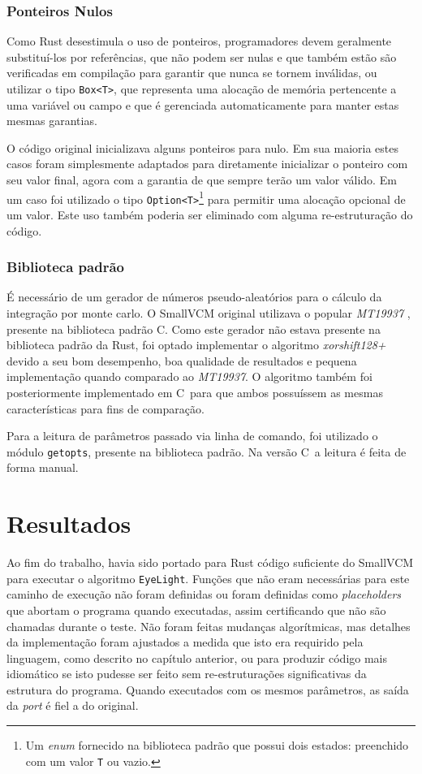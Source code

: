 \documentclass[tg]{mdtufsm}
\def\Cpp{{C\nolinebreak[4]\raisebox{.20ex}{\small\bf++}}}
\begin{document}
\subsection{Ponteiros Nulos}

Como Rust desestimula o uso de ponteiros, programadores devem geralmente substituí-los por referências, que não podem ser nulas e que também estão são verificadas em compilação para garantir que nunca se tornem inválidas, ou utilizar o tipo \texttt{Box<T>}, que representa uma alocação de memória pertencente a uma variável ou campo e que é gerenciada automaticamente para manter estas mesmas garantias.

O código original inicializava alguns ponteiros para nulo. Em sua maioria estes casos foram simplesmente adaptados para diretamente inicializar o ponteiro com seu valor final, agora com a garantia de que sempre terão um valor válido. Em um caso foi utilizado o tipo \texttt{Option<T>}\footnote{Um \emph{enum} fornecido na biblioteca padrão que possui dois estados: preenchido com um valor \texttt{T} ou vazio.} para permitir uma alocação opcional de um valor. Este uso também poderia ser eliminado com alguma re-estruturação do código.

\subsection{Biblioteca padrão}

É necessário de um gerador de números pseudo-aleatórios para o cálculo da integração por monte carlo. O SmallVCM original utilizava o popular \emph{MT19937}  \citep{matsumoto1998}, presente na biblioteca padrão \Cpp. Como este gerador não estava presente na biblioteca padrão da Rust, foi optado implementar o algoritmo \emph{xorshift128+} \citep{vigna2014} devido a seu bom desempenho, boa qualidade de resultados e pequena implementação quando comparado ao \emph{MT19937}. O algoritmo também foi posteriormente implementado em \Cpp\ para que ambos possuíssem as mesmas características para fins de comparação.

Para a leitura de parâmetros passado via linha de comando, foi utilizado o módulo \texttt{getopts}, presente na biblioteca padrão. Na versão \Cpp\ a leitura é feita de forma manual.

\chapter{Resultados}

Ao fim do trabalho, havia sido portado para Rust código suficiente do SmallVCM para executar o algoritmo \texttt{EyeLight}. Funções que não eram necessárias para este caminho de execução não foram definidas ou foram definidas como \emph{placeholders} que abortam o programa quando executadas, assim certificando que não são chamadas durante o teste. Não foram feitas mudanças algorítmicas, mas detalhes da implementação foram ajustados a medida que isto era requirido pela linguagem, como descrito no capítulo anterior, ou para produzir código mais idiomático se isto pudesse ser feito sem re-estruturações significativas da estrutura do programa. Quando executados com os mesmos parâmetros, as saída da \emph{port} é fiel a do original.
\end{document}

